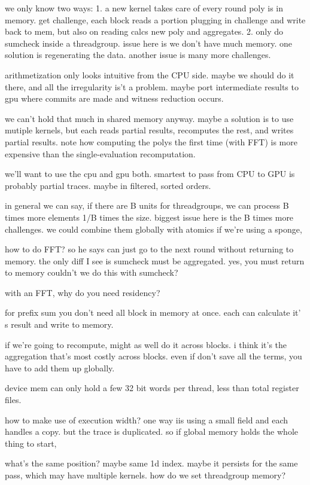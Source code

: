 we only know two ways:
1. a new kernel takes care of every round
    poly is in memory. get challenge, each block reads a portion plugging in challenge and write back to mem, but also on reading calcs new poly and aggregates.
2. only do sumcheck inside a threadgroup. issue here is we don't have much memory. one solution is regenerating the data. another issue is many more challenges. 

arithmetization only looks intuitive from the CPU side. maybe we should do it there, and all the irregularity is't a problem. maybe port intermediate results to gpu where commits are made and witness reduction occurs. 


we can't hold that much in shared memory anyway. maybe a solution is to use mutiple kernels, but each reads partial results, recomputes the rest, and writes partial results. 
note how computing the polys the first time (with FFT) is more expensive than the single-evaluation recomputation.



we'll want to use the cpu and gpu both.
smartest to pass from CPU to GPU is probably partial traces. maybe in filtered, sorted orders. 

in general we can say, if there are B units for threadgroups, we can process B times more elements 1/B times the size. biggest issue here is the B times more challenges. we could combine them globally with atomics if we're using a sponge, 


how to do FFT?
so he says can just go to the next round without returning to memory.
the only diff I see is sumcheck must be aggregated. yes, you must return to memory 
couldn't we do this with sumcheck? 

with an FFT, why do you need residency? 

for prefix sum you don't need all block in memory at once. each can calculate it' s result and write to memory. 

if we're going to recompute, might as well do it across blocks. 
i think it's the aggregation that's most costly across blocks. even if don't save all the terms, you have to add them up globally. 

device mem can only hold a few 32 bit words per thread, less than total register files. 

how to make use of execution width?
one way iis using a small field and each handles a copy. but the trace is duplicated. 
so if global memory holds the whole thing to start, 

what's the same position? maybe same 1d index.
maybe it persists for the same pass, which may have multiple kernels. 
how do we set threadgroup memory?

